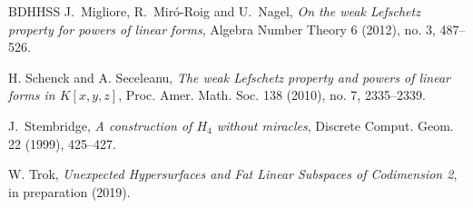 \documentclass[12pt]{amsart}
\numberwithin{equation}{section}
\theoremstyle{definition}
\begin{document}
\begin{thebibliography}{BDHHSS}
J.\ Migliore, R.\ Mir\'o-Roig and U.\ Nagel, {\em On the weak Lefschetz property for 
powers of linear forms}, Algebra Number Theory 6 (2012), no. 3, 487--526.

H. Schenck and A. Seceleanu, {\em The weak Lefschetz property and powers of linear
forms in $K[x, y, z]$}, Proc. Amer. Math. Soc. 138 (2010), no. 7, 2335--2339.


J.\ Stembridge,
{\em A construction of $H_4$ without miracles}, Discrete Comput. Geom. 22 (1999), 425--427.

 W. Trok, {\em Unexpected Hypersurfaces and Fat Linear Subspaces of Codimension 2}, in preparation (2019).

\end{thebibliography}
\end{document}

